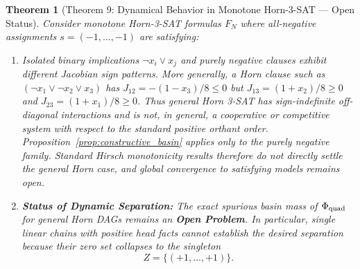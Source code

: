 \documentclass[11pt,a4paper]{article}
\newtheorem{theorem}{Theorem}[section]
\begin{document}
\begin{theorem}[Theorem 9: Dynamical Behavior in Monotone Horn-3-SAT --- Open Status]
\label{thm:horn_separation}
Consider monotone Horn-3-SAT formulas $F_N$ where all-negative assignments $s = (-1, \dots, -1)$ are satisfying:
\begin{enumerate}
    \item Isolated binary implications $\neg x_i \lor x_j$ and purely negative clauses exhibit different Jacobian sign patterns.  More generally, a Horn clause such as
    $(\neg x_1\lor\neg x_2\lor x_3)$ has
    $J_{12}=-(1-x_3)/8\le0$ but
    $J_{13}=(1+x_2)/8\ge0$ and
    $J_{23}=(1+x_1)/8\ge0$.
    Thus general Horn 3-SAT has sign-indefinite off-diagonal interactions and is not, in general, a cooperative or competitive system with respect to the standard positive orthant order.  Proposition~\ref{prop:constructive_basin} applies only to the purely negative family.  Standard Hirsch monotonicity results therefore do not directly settle the general Horn case, and global convergence to satisfying models remains open.
    \item \textbf{Status of Dynamic Separation:} The exact spurious basin mass of $\Phi_{\rm quad}$ for general Horn DAGs remains an \textbf{Open Problem}.  In particular, single linear chains with positive head facts cannot establish the desired separation because their zero set collapses to the singleton
    \[
    Z=\{(+1,\dots,+1)\}.
    \]
\end{enumerate}
\end{theorem}
\end{document}
